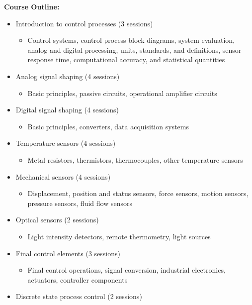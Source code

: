 \documentclass[12pt]{article}
\begin{document}
\textbf{Course Outline:}
\begin{itemize}
    \item Introduction to control processes (3 sessions)
    \begin{itemize}
        \item Control systems, control process block diagrams, system evaluation, analog and digital processing, units, standards, and definitions, sensor response time, computational accuracy, and statistical quantities
    \end{itemize}
    \item Analog signal shaping (4 sessions)
    \begin{itemize}
        \item Basic principles, passive circuits, operational amplifier circuits
    \end{itemize}
    \item Digital signal shaping (4 sessions)
    \begin{itemize}
        \item Basic principles, converters, data acquisition systems
    \end{itemize}
    \item Temperature sensors (4 sessions)
    \begin{itemize}
        \item Metal resistors, thermistors, thermocouples, other temperature sensors
    \end{itemize}
    \item Mechanical sensors (4 sessions)
    \begin{itemize}
        \item Displacement, position and status sensors, force sensors, motion sensors, pressure sensors, fluid flow sensors
    \end{itemize}
    \item Optical sensors (2 sessions)
    \begin{itemize}
        \item Light intensity detectors, remote thermometry, light sources
    \end{itemize}
    \item Final control elements (3 sessions)
    \begin{itemize}
        \item Final control operations, signal conversion, industrial electronics, actuators, controller components
    \end{itemize}
    \item Discrete state process control (2 sessions)

\end{itemize}
\end{document}
